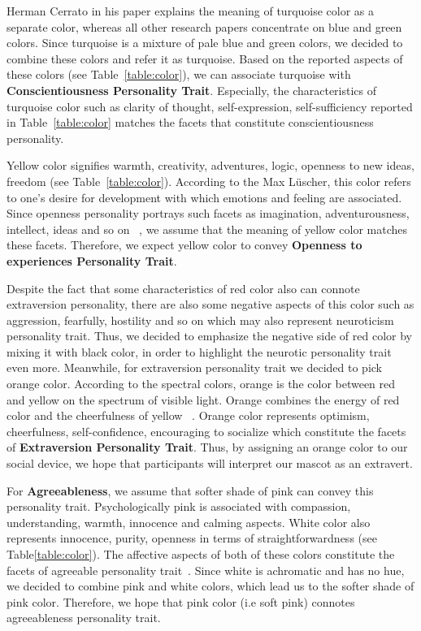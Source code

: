 Herman Cerrato in his paper explains the meaning of turquoise color as a separate color, whereas
all other research papers concentrate on blue and green colors.
Since turquoise is a mixture of pale blue and green colors, we decided to combine
these colors and refer it as turquoise.
Based on the reported aspects of these colors (see Table~\ref{table:color}),
we can associate turquoise with \textbf{Conscientiousness Personality Trait}.
Especially, the characteristics of turquoise color such as clarity of thought,
self-expression, self-sufficiency reported in Table~\ref{table:color} matches the
facets that constitute conscientiousness personality.

Yellow color signifies warmth, creativity, adventures, logic, openness to new
ideas, freedom (see Table~\ref{table:color}).
According to the Max Lüscher, this color refers to one’s desire for development
with which emotions and feeling are associated.
Since openness personality portrays such facets as imagination, adventurousness, intellect, ideas
and so on ~\cite{costa1988catalog}, we assume that the meaning of yellow color matches these facets.
Therefore, we expect yellow color to convey \textbf{Openness to experiences Personality Trait}.

Despite the fact that some characteristics of red color also can connote extraversion personality,
there are also some negative aspects of this color such as aggression, fearfully,
hostility and so on which may also represent neuroticism personality trait.
Thus, we decided to emphasize the negative side of red color by mixing it with black color,
in order to highlight the neurotic personality trait even more.
Meanwhile, for extraversion personality trait we decided to pick orange color.
According to the spectral colors, orange is the color between red and yellow on the spectrum of visible light.
Orange combines the energy of red color and the cheerfulness of yellow ~\cite{cerrato2012meaning}.
Orange color represents optimism, cheerfulness, self-confidence, encouraging
to socialize which constitute the facets of  \textbf{Extraversion Personality Trait}.
Thus, by assigning an orange color to our social device, we hope that
participants will interpret our mascot as an extravert.

For \textbf{Agreeableness}, we assume that softer shade of pink can convey this personality trait.
Psychologically pink is associated with compassion, understanding, warmth, innocence and calming aspects.
White color also represents innocence, purity, openness in terms of straightforwardness (see Table\ref{table:color}).
The affective aspects of both of these colors constitute the facets of
agreeable personality trait~\cite{costa1988catalog}.
Since white is achromatic and has no hue, we decided to combine
pink and white colors, which lead us to the softer shade of pink color.
Therefore, we hope that pink color (i.e soft pink) connotes agreeableness personality trait.



